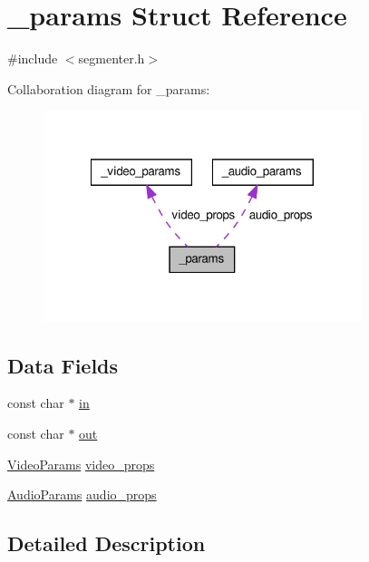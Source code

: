\hypertarget{struct__params}{\section{\-\_\-params \-Struct \-Reference}
\label{struct__params}
}


{\ttfamily \#include $<$segmenter.\-h$>$}



\-Collaboration diagram for \-\_\-params\-:\nopagebreak
\begin{figure}[H]
\begin{center}
\leavevmode
\includegraphics[width=263pt]{struct__params__coll__graph}
\end{center}
\end{figure}
\subsection*{\-Data \-Fields}
\begin{DoxyCompactItemize}
\item 
const char $\ast$ \hyperlink{struct__params_a52bb50fce643c4899922808db7d60d42}{in}
\item 
const char $\ast$ \hyperlink{struct__params_a8905de849f303a8598c0f7c3d37d46ed}{out}
\item 
\hyperlink{segmenter_8h_a1666894b15eabe395e38f7239af909b5}{\-Video\-Params} \hyperlink{struct__params_ae8e5c5323efdf97ec1e66866b906f813}{video\-\_\-props}
\item 
\hyperlink{segmenter_8h_aec2d7f32ce7a93dcc3c613460ffb70fc}{\-Audio\-Params} \hyperlink{struct__params_a219b79cb42ef34f697906a8d8366c947}{audio\-\_\-props}
\end{DoxyCompactItemize}


\subsection{\-Detailed \-Description}


